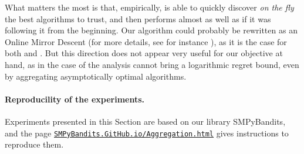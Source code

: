 What matters the most is that, empirically, \Aggr{} is able to quickly discover \emph{on the fly} the best algorithms to trust, and then performs almost as well as if it was following it from the beginning.
%
%
Our \Aggr{} algorithm could probably be rewritten as an Online Mirror Descent (for more details, see for instance \cite{Hazan2016introduction,Zimmert2018}), as it is the case for both \ExpQ{} and \CORRAL.
But this direction does not appear very useful for our objective at hand, as in the case of \CORRAL{}  the analysis cannot bring a logarithmic regret bound, even by aggregating asymptotically optimal algorithms.


\paragraph{Reproducility of the experiments.}
%
Experiments presented in this Section are based on our library SMPyBandits,
and the page \href{https://SMPyBandits.GitHub.io/Aggregation.html}{\texttt{SMPyBandits.GitHub.io/Aggregation.html}} gives instructions to reproduce them.

